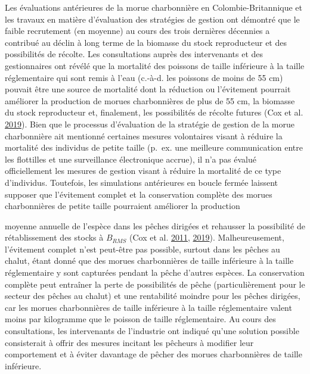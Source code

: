 \documentclass[11pt]{book}
\begin{document}
Les évaluations antérieures de la morue charbonnière en Colombie-Britannique et les travaux en matière d'évaluation des stratégies de gestion ont démontré que le faible recrutement (en moyenne) au cours des trois dernières décennies a contribué au déclin à long terme de la biomasse du stock reproducteur et des possibilités de récolte. Les consultations auprès des intervenants et des gestionnaires ont révélé que la mortalité des poissons de taille inférieure à la taille réglementaire qui sont remis à l'eau (c.-à-d. les poissons de moins de 55 cm) pouvait être une source de mortalité dont la réduction ou l'évitement pourrait améliorer la production de morues charbonnières de plus de 55 cm, la biomasse du stock reproducteur et, finalement, les possibilités de récolte futures (Cox et al. \protect\hyperlink{ref-cox2019evaluating}{2019}). Bien que le processus d'évaluation de la stratégie de gestion de la morue charbonnière ait mentionné certaines mesures volontaires visant à réduire la mortalité des individus de petite taille (p.~ex. une meilleure communication entre les flottilles et une surveillance électronique accrue), il n'a pas évalué officiellement les mesures de gestion visant à réduire la mortalité de ce type d'individus. Toutefois, les simulations antérieures en boucle fermée laissent supposer que l'évitement complet et la conservation complète des morues charbonnières de petite taille pourraient améliorer la production

moyenne annuelle de l'espèce dans les pêches dirigées et rehausser la possibilité de rétablissement des stocks à \(B_{RMS}\) (Cox et al. \protect\hyperlink{ref-cox2011management}{2011}, \protect\hyperlink{ref-cox2019evaluating}{2019}). Malheureusement, l'évitement complet n'est peut-être pas possible, surtout dans les pêches au chalut, étant donné que des morues charbonnières de taille inférieure à la taille réglementaire y sont capturées pendant la pêche d'autres espèces. La conservation complète peut entraîner la perte de possibilités de pêche (particulièrement pour le secteur des pêches au chalut) et une rentabilité moindre pour les pêches dirigées, car les morues charbonnières de taille inférieure à la taille réglementaire valent moins par kilogramme que le poisson de taille réglementaire. Au cours des consultations, les intervenants de l'industrie ont indiqué qu'une solution possible consisterait à offrir des mesures incitant les pêcheurs à modifier leur comportement et à éviter davantage de pêcher des morues charbonnières de taille inférieure.
\end{document}
